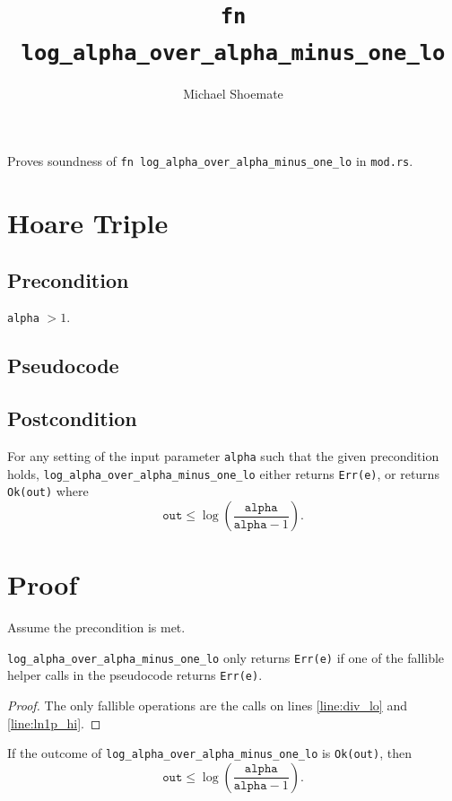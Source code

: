 \documentclass{article}
\title{\texttt{fn log\_alpha\_over\_alpha\_minus\_one\_lo}}
\author{Michael Shoemate}
\begin{document}
\maketitle

Proves soundness of \texttt{fn log\_alpha\_over\_alpha\_minus\_one\_lo} in \texttt{mod.rs}.

\section{Hoare Triple}
\subsection*{Precondition}
\texttt{alpha} $> 1$.

\subsection*{Pseudocode}


\subsection*{Postcondition}
\begin{theorem}
\label{postcondition}
For any setting of the input parameter \texttt{alpha} such that the given precondition holds,
\texttt{log\_alpha\_over\_alpha\_minus\_one\_lo} either returns \texttt{Err(e)},
or returns \texttt{Ok(out)} where
\[
\texttt{out} \le \log\!\left(\frac{\texttt{alpha}}{\texttt{alpha} - 1}\right).
\]
\end{theorem}

\section{Proof}
Assume the precondition is met.

\begin{lemma}
\label{err-e}
\texttt{log\_alpha\_over\_alpha\_minus\_one\_lo} only returns \texttt{Err(e)} if one of the
fallible helper calls in the pseudocode returns \texttt{Err(e)}.
\end{lemma}

\begin{proof}
The only fallible operations are the calls on lines \ref{line:div_lo} and \ref{line:ln1p_hi}.
\end{proof}

\begin{lemma}
\label{ok-out}
If the outcome of \texttt{log\_alpha\_over\_alpha\_minus\_one\_lo} is \texttt{Ok(out)}, then
\[
\texttt{out} \le \log\!\left(\frac{\texttt{alpha}}{\texttt{alpha} - 1}\right).
\]
\end{lemma}
\end{document}

